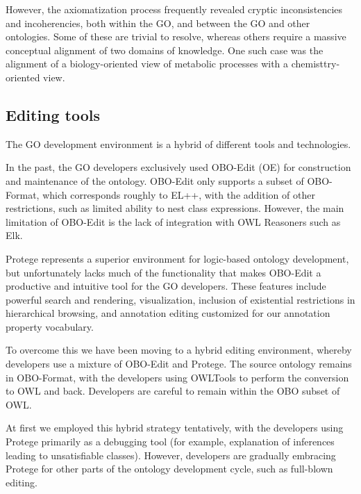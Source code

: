 \documentclass{llncs}
\begin{document}
However, the axiomatization process frequently revealed cryptic
inconsistencies and incoherencies, both within the GO, and between the
GO and other ontologies. Some of these are trivial to resolve, whereas
others require a massive conceptual alignment of two domains of
knowledge. One such case was the alignment of a biology-oriented view
of metabolic processes with a chemisttry-oriented view\cite{Hill2013}.

\subsection{Editing tools}

The GO development environment is a hybrid of different tools and
technologies.

In the past, the GO developers exclusively used
OBO-Edit (OE)\cite{Day-Richter2007} for construction and maintenance of the
ontology. OBO-Edit only supports a subset of OBO-Format, which
corresponds roughly to EL++, with the addition of other restrictions,
such as limited ability to nest class expressions. However, the main
limitation of OBO-Edit is the lack of integration with OWL Reasoners
such as Elk.

Protege represents a superior environment for logic-based ontology
development, but unfortunately lacks much of the functionality that
makes OBO-Edit a productive and intuitive tool for the GO
developers. These features include powerful search and rendering,
visualization, inclusion of existential restrictions in hierarchical
browsing, and annotation editing customized for our annotation property vocabulary.


To overcome this we have been moving to a hybrid editing environment,
whereby developers use a mixture of OBO-Edit and Protege. The source
ontology remains in OBO-Format, with the developers using 
OWLTools\cite{OWLTools} to perform the conversion to OWL and
back. Developers are careful to remain within the OBO subset of OWL. 

At first we employed this hybrid strategy tentatively, with the
developers using Protege primarily as a debugging tool (for example,
explanation of inferences leading to unsatisfiable classes). However,
developers are gradually embracing Protege for other parts of the
ontology development cycle, such as full-blown editing.
\end{document}
